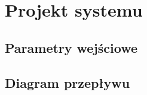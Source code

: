 \chapter{Projekt systemu}
\thispagestyle{chapterBeginStyle}

\section{Parametry wejściowe}
\section{Diagram przepływu}




